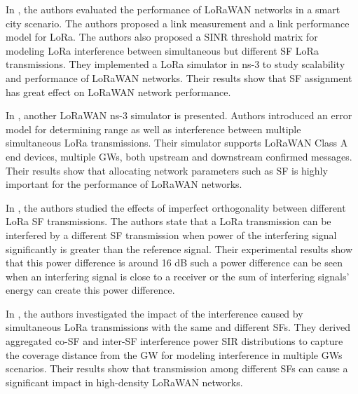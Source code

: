 \documentclass[conference]{IEEEtran}
\begin{document}
\par In \cite{7996384}, the authors evaluated the performance of LoRaWAN networks in a smart city scenario. The authors proposed a link measurement and a link performance model for LoRa. The authors also proposed a SINR threshold matrix for modeling LoRa interference between simultaneous but different SF LoRa transmissions. They implemented a LoRa simulator in ns-3 to study scalability and performance of LoRaWAN networks. Their results show that SF assignment has great effect on LoRaWAN network performance.

\par In \cite{8090518}, another LoRaWAN ns-3 simulator is presented. Authors introduced an error model for determining range as well as interference between multiple simultaneous LoRa transmissions. Their simulator supports LoRaWAN Class A end devices, multiple GWs, both upstream and downstream confirmed messages. Their results show that allocating network parameters such as SF is highly important for the performance of LoRaWAN networks.

\par In \cite{8267219}, the authors studied the effects of imperfect orthogonality between different LoRa SF transmissions. The authors state that a LoRa transmission can be interfered by a different SF transmission when power of the interfering signal significantly is greater than the reference signal. Their experimental results show that this power difference is around 16 dB such a power difference can be seen when an interfering signal is close to a receiver or the sum of interfering signals' energy can create this power difference.

\par In \cite{8430542}, the authors investigated the impact of the interference caused by simultaneous LoRa transmissions with the same and different SFs. They derived aggregated co-SF and inter-SF interference power SIR distributions to capture the coverage distance from the GW for modeling interference in multiple GWs scenarios. Their results show that transmission among different SFs can cause a significant impact in high-density LoRaWAN networks.
\end{document}
